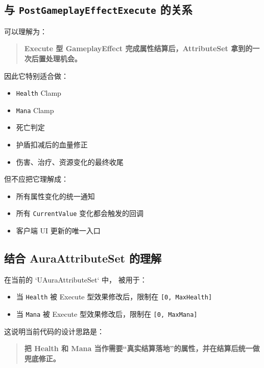 \documentclass[10pt,CJKmath]{ctexart}
\begin{document}
\subsection{与 \texttt{PostGameplayEffectExecute} 的关系}

 可以理解为：

\begin{quote}
	\textbf{Execute 型 GameplayEffect 完成属性结算后，AttributeSet 拿到的一次后置处理机会。}
\end{quote}

因此它特别适合做：

\begin{itemize}
	\item \verb|Health| Clamp
	\item \verb|Mana| Clamp
	\item 死亡判定
	\item 护盾扣减后的血量修正
	\item 伤害、治疗、资源变化的最终收尾
\end{itemize}

但不应把它理解成：

\begin{itemize}
	\item 所有属性变化的统一通知
	\item 所有 \verb|CurrentValue| 变化都会触发的回调
	\item 客户端 UI 更新的唯一入口
\end{itemize}

\subsection{结合 AuraAttributeSet 的理解}

在当前的 `UAuraAttributeSet` 中， 被用于：

\begin{itemize}
	\item 当 \verb|Health| 被 Execute 型效果修改后，限制在 \verb|[0, MaxHealth]|
	\item 当 \verb|Mana| 被 Execute 型效果修改后，限制在 \verb|[0, MaxMana]|
\end{itemize}

这说明当前代码的设计思路是：

\begin{quote}
	\textbf{把 Health 和 Mana 当作需要“真实结算落地”的属性，并在结算后统一做兜底修正。}
\end{quote}
\end{document}
